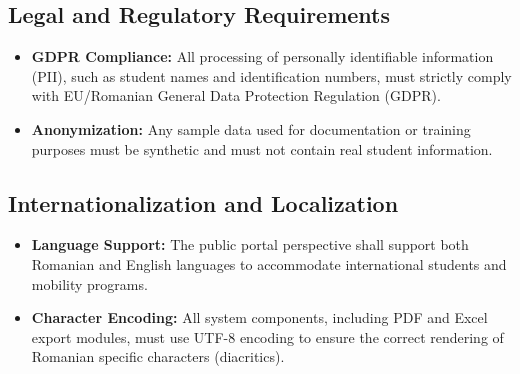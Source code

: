 \documentclass[11pt, a4paper]{article}
\begin{document}
\subsection{Legal and Regulatory Requirements}
\begin{itemize}
    \item \textbf{GDPR Compliance:} All processing of personally identifiable information (PII), such as student names and identification numbers, must strictly comply with EU/Romanian General Data Protection Regulation (GDPR).
    \item \textbf{Anonymization:} Any sample data used for documentation or training purposes must be synthetic and must not contain real student information.
\end{itemize}

\subsection{Internationalization and Localization}
\begin{itemize}
    \item \textbf{Language Support:} The public portal perspective shall support both Romanian and English languages to accommodate international students and mobility programs.
    \item \textbf{Character Encoding:} All system components, including PDF and Excel export modules, must use UTF-8 encoding to ensure the correct rendering of Romanian specific characters (diacritics).
\end{itemize}

\newpage
\appendix
\end{document}
